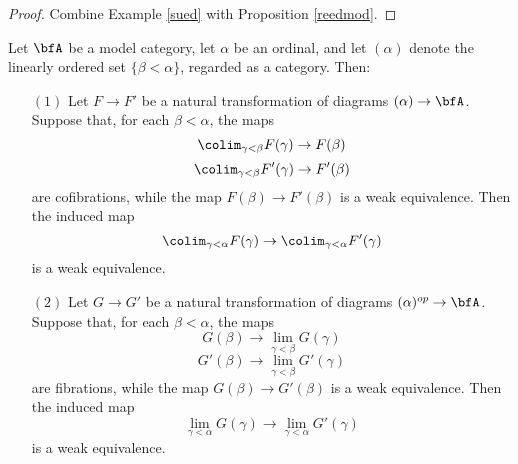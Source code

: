 
\begin{proof}
Combine Example \ref{sued} with Proposition \ref{reedmod}.
\end{proof}

\begin{corollary}\label{jonnyt}
Let $\bfA$ be a model category, let $\alpha$ be an ordinal, and let
$(\alpha)$ denote the linearly ordered set $\{ \beta < \alpha \}$, regarded as a category. Then:
\begin{itemize}
\item[$(1)$] Let $F \rightarrow F'$ be a natural transformation of diagrams
$(\alpha) \rightarrow \bfA$. Suppose that, for each $\beta < \alpha$, the maps
$$ \colim_{\gamma < \beta} F(\gamma) \rightarrow F(\beta)$$
$$ \colim_{\gamma < \beta} F'(\gamma) \rightarrow F'(\beta)$$
are cofibrations, while the map $F(\beta) \rightarrow F'(\beta)$ is a weak equivalence.
Then the induced map $$\colim_{\gamma < \alpha} F(\gamma) \rightarrow \colim_{\gamma < \alpha} F'(\gamma)$$ is a weak equivalence.
\item[$(2)$] Let $G \rightarrow G'$ be a natural transformation of diagrams
$(\alpha)^{op} \rightarrow \bfA$. Suppose that, for each $\beta < \alpha$, the maps
$$ G(\beta) \rightarrow \lim_{\gamma < \beta} G(\gamma)$$
$$ G'(\beta) \rightarrow \lim_{\gamma < \beta} G'(\gamma)$$
are fibrations, while the map $G(\beta) \rightarrow G'(\beta)$ is a weak equivalence.
Then the induced map $$\lim_{\gamma < \alpha} G(\gamma) \rightarrow \lim_{\gamma < \alpha} G'(\gamma)$$ is a weak equivalence.
\end{itemize}
\end{corollary}

